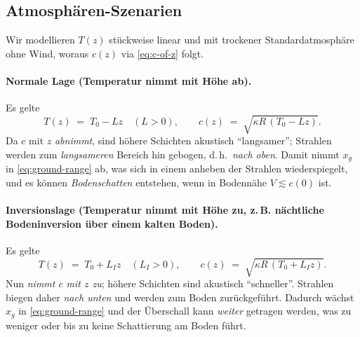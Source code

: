 \subsection{Atmosphären-Szenarien}\label{schall:subsection:atmos-scenarios}
Wir modellieren $T(z)$ stückweise linear und mit trockener
Standardatmosphäre ohne Wind, woraus $c(z)$ via \eqref{eq:c-of-z} folgt.

\paragraph{Normale Lage (Temperatur nimmt mit Höhe ab).}
Es gelte
\begin{equation}
    T(z) \;=\; T_0 - Lz \quad (L>0),
    \qquad
    c(z) \;=\; \sqrt{\kappa R\,(T_0 - Lz)} .
    \label{eq:normal-lapse}
\end{equation}
Da $c$ mit $z$ \emph{abnimmt}, sind höhere Schichten akustisch
``langsamer''; Strahlen werden zum \emph{langsameren} Bereich hin
gebogen, d.\,h.\ \emph{nach oben}.
Damit nimmt $x_g$ in \eqref{eq:ground-range} ab, was sich in einem anheben
der Strahlen wiederspiegelt, und es können \emph{Bodenschatten}
entstehen, wenn in Bodennähe $V\lesssim c(0)$ ist.

\paragraph{Inversionslage (Temperatur nimmt mit Höhe zu, z.\,B.
nächtliche Bodeninversion über einem kalten Boden).}
Es gelte
\begin{equation}
    T(z) \;=\; T_0 + L_{I} z \quad (L_{I}>0),
    \qquad
    c(z) \;=\; \sqrt{\kappa R\,(T_0 + L_{I} z)} .
    \label{eq:inversion}
\end{equation}
Nun \emph{nimmt $c$ mit $z$ zu}; höhere Schichten sind akustisch ``schneller''.
Strahlen biegen daher \emph{nach unten} und werden zum Boden zurückgeführt.
Dadurch wächst $x_g$ in \eqref{eq:ground-range} und der Überschall
kann \emph{weiter} getragen werden, was zu weniger oder bis zu keine
Schattierung am Boden führt.

